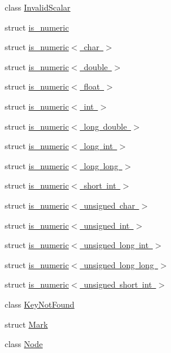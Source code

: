 \begin{DoxyCompactItemize}
class \mbox{\hyperlink{class_y_a_m_l_1_1_invalid_scalar}{Invalid\+Scalar}}
\item 
struct \mbox{\hyperlink{struct_y_a_m_l_1_1is__numeric}{is\+\_\+numeric}}
\item 
struct \mbox{\hyperlink{struct_y_a_m_l_1_1is__numeric_3_01char_01_4}{is\+\_\+numeric$<$ char $>$}}
\item 
struct \mbox{\hyperlink{struct_y_a_m_l_1_1is__numeric_3_01double_01_4}{is\+\_\+numeric$<$ double $>$}}
\item 
struct \mbox{\hyperlink{struct_y_a_m_l_1_1is__numeric_3_01float_01_4}{is\+\_\+numeric$<$ float $>$}}
\item 
struct \mbox{\hyperlink{struct_y_a_m_l_1_1is__numeric_3_01int_01_4}{is\+\_\+numeric$<$ int $>$}}
\item 
struct \mbox{\hyperlink{struct_y_a_m_l_1_1is__numeric_3_01long_01double_01_4}{is\+\_\+numeric$<$ long double $>$}}
\item 
struct \mbox{\hyperlink{struct_y_a_m_l_1_1is__numeric_3_01long_01int_01_4}{is\+\_\+numeric$<$ long int $>$}}
\item 
struct \mbox{\hyperlink{struct_y_a_m_l_1_1is__numeric_3_01long_01long_01_4}{is\+\_\+numeric$<$ long long $>$}}
\item 
struct \mbox{\hyperlink{struct_y_a_m_l_1_1is__numeric_3_01short_01int_01_4}{is\+\_\+numeric$<$ short int $>$}}
\item 
struct \mbox{\hyperlink{struct_y_a_m_l_1_1is__numeric_3_01unsigned_01char_01_4}{is\+\_\+numeric$<$ unsigned char $>$}}
\item 
struct \mbox{\hyperlink{struct_y_a_m_l_1_1is__numeric_3_01unsigned_01int_01_4}{is\+\_\+numeric$<$ unsigned int $>$}}
\item 
struct \mbox{\hyperlink{struct_y_a_m_l_1_1is__numeric_3_01unsigned_01long_01int_01_4}{is\+\_\+numeric$<$ unsigned long int $>$}}
\item 
struct \mbox{\hyperlink{struct_y_a_m_l_1_1is__numeric_3_01unsigned_01long_01long_01_4}{is\+\_\+numeric$<$ unsigned long long $>$}}
\item 
struct \mbox{\hyperlink{struct_y_a_m_l_1_1is__numeric_3_01unsigned_01short_01int_01_4}{is\+\_\+numeric$<$ unsigned short int $>$}}
\item 
class \mbox{\hyperlink{class_y_a_m_l_1_1_key_not_found}{Key\+Not\+Found}}
\item 
struct \mbox{\hyperlink{struct_y_a_m_l_1_1_mark}{Mark}}
\item 
class \mbox{\hyperlink{class_y_a_m_l_1_1_node}{Node}}

\end{DoxyCompactItemize}
